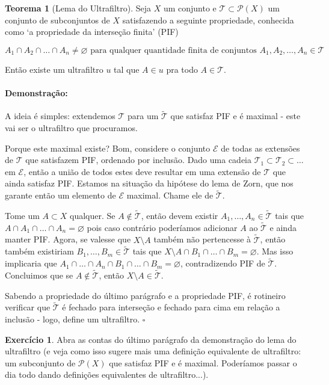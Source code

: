 \documentclass[11pt]{article}
\renewcommand{\textbf}[1]{{\fakebold#1}}
\newcommand{\pulinho}{\vspace{.5cm}}
\newcommand{\luafacil}{
\emoji{waxing-crescent-moon}
}
\theoremstyle{definition}
\newtheorem{theorem}{Teorema}
\newenvironment{teorema}{
\definecolor{shadecolor}{HTML}{f59aa3}
\begin{shaded}
\begin{theorem}
}
{
\end{theorem}
\end{shaded}
}
\theoremstyle{definition}
\theoremstyle{definition}
\theoremstyle{definition}
\theoremstyle{definition}
\theoremstyle{definition}
\theoremstyle{definition}
\theoremstyle{definition}
\theoremstyle{definition}
\theoremstyle{definition}
\theoremstyle{definition}
\theoremstyle{definition}
\newenvironment{prova}{\paragraph{Demonstração:}}{\hfill$\square$ 
\pulinho
}
\theoremstyle{definition}
\newtheorem{exersisio}{Exercício}
\newenvironment{exercicio}{
\definecolor{shadecolor}{HTML}{CFB5FF}
\begin{shaded}
\begin{exersisio}
}
{
\end{exersisio}
\end{shaded}
}
\begin{document}
\begin{teorema}[Lema do Ultrafiltro]
Seja $X$ um conjunto e $\mathcal{T} \subset \mathcal{P}(X)$ um conjunto de subconjuntos de $X$ satisfazendo a seguinte propriedade, conhecida como \textbf{`a propriedade da interseção finita' (PIF)}

\[ A_1 \cap A_2 \cap \dots \cap A_n \neq \varnothing \text{ para qualquer quantidade finita de conjuntos } A_1,A_2, \dots, A_n \in \mathcal{T}\]

Então existe um ultrafiltro $u$ tal que $A \in u$ pra todo $A \in \mathcal{T}$.
\end{teorema}
\begin{prova}
  A ideia é simples: extendemos $\mathcal{T}$ para um $\widetilde{\mathcal{T}}$ que satisfaz PIF e é maximal - este vai ser o ultrafiltro que procuramos.

  Porque este maximal existe? Bom, considere o conjunto $\mathcal{E}$ de todas as extensões de $\mathcal{T}$ que satisfazem PIF, ordenado por inclusão. Dado uma cadeia $\mathcal{T}_1 \subset \mathcal{T}_2 \subset \dots $ em $\mathcal{E}$, então a união de todos estes deve resultar em uma extensão de $\mathcal{T}$ que ainda satisfaz PIF. Estamos na situação da hipótese do lema de Zorn, que nos garante então um elemento de $\mathcal{E}$ maximal. Chame ele de $\widetilde{\mathcal{T}}$.

  Tome um $A \subset X$ qualquer. Se $A \notin \widetilde{\mathcal{T}}$, então devem existir $A_1, \dots, A_n \in \widetilde{\mathcal{T}}$ tais que $A \cap A_1 \cap \dots \cap A_n = \varnothing$ pois caso contrário poderíamos adicionar $A$ ao $\widetilde{\mathcal{T}}$ e ainda manter PIF. Agora, se valesse que $X \setminus A$ também não pertencesse à $\widetilde{\mathcal{T}}$, então também existiriam $B_1, \dots, B_m \in \widetilde{\mathcal{T}}$ tais que $X \setminus A \cap B_1 \cap \dots \cap B_m = \varnothing$. Mas isso implicaria que $A_1 \cap \dots \cap A_n \cap B_1 \cap \dots \cap B_m = \varnothing$, contradizendo PIF de $\widetilde{\mathcal{T}}$. Concluimos que se $A \notin \widetilde{\mathcal{T}}$, então $X \setminus A \in \widetilde{\mathcal{T}}$.

  Sabendo a propriedade do último parágrafo e a propriedade PIF, é rotineiro verificar que $\widetilde{\mathcal{T}}$ é fechado para interseção e fechado para cima em relação a inclusão - logo, define um ultrafiltro.
\end{prova}

\begin{exercicio}
  \luafacil Abra as contas do último parágrafo da demonstração do lema do ultrafiltro (e veja como isso sugere mais uma definição equivalente de ultrafiltro: um subconjunto de $\mathcal{P}(X)$ que satisfaz PIF e é maximal. Poderíamos passar o dia todo dando definições equivalentes de ultrafiltro...).
\end{exercicio}
\end{document}
